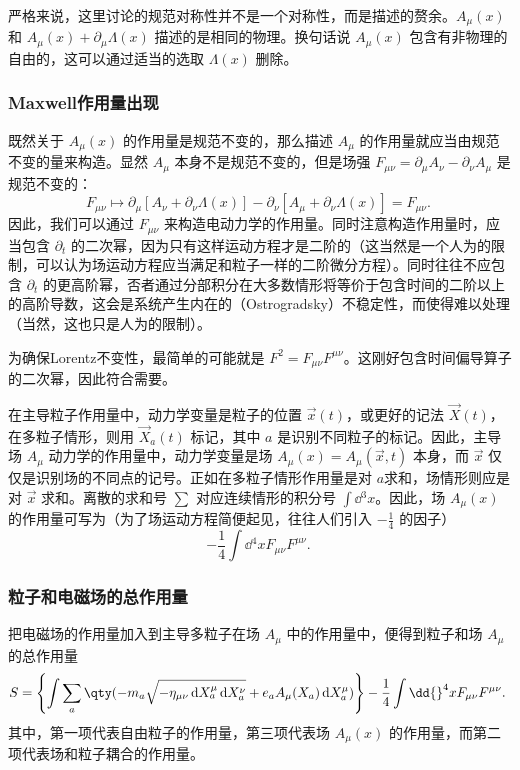 严格来说，这里讨论的规范对称性并不是一个对称性，而是描述的赘余。$A_\mu(x)$ 和 $A_\mu(x)+\partial_\mu\Lambda(x)$ 描述的是相同的物理。换句话说 $A_\mu(x)$ 包含有非物理的自由的，这可以通过适当的选取 $\Lambda(x)$ 删除。

\subsubsection{Maxwell作用量出现}

既然关于 $A_\mu(x)$ 的作用量是规范不变的，那么描述 $A_\mu$ 的作用量就应当由规范不变的量来构造。显然 $A_\mu$ 本身不是规范不变的，但是场强 $F_{\mu\nu}=\partial_\mu A_\nu-\partial_\nu A_\mu$ 是规范不变的：
\begin{equation}
F_{\mu\nu}\mapsto \partial_\mu[ A_\nu+\partial_\nu\Lambda(x)]-\partial_\nu[ A_\mu+\partial_\nu\Lambda(x)]=F_{\mu\nu}.~
\end{equation}
因此，我们可以通过 $F_{\mu\nu}$ 来构造电动力学的作用量。同时注意构造作用量时，应当包含 $\partial_t$ 的二次幂，因为只有这样运动方程才是二阶的（这当然是一个人为的限制，可以认为场运动方程应当满足和粒子一样的二阶微分方程）。同时往往不应包含 $\partial_t$ 的更高阶幂，否者通过分部积分在大多数情形将等价于包含时间的二阶以上的高阶导数，这会是系统产生内在的（Ostrogradsky）不稳定性，而使得难以处理（当然，这也只是人为的限制）。

为确保Lorentz不变性，最简单的可能就是 $F^2=F_{\mu\nu}F^{\mu\nu}$。这刚好包含时间偏导算子的二次幂，因此符合需要。

在主导粒子作用量中，动力学变量是粒子的位置 $\vec x(t)$，或更好的记法 $\vec X(t)$，在多粒子情形，则用 $\vec X_a(t)$ 标记，其中 $a$ 是识别不同粒子的标记。因此，主导场 $A_\mu$ 动力学的作用量中，动力学变量是场 $A_\mu(x)=A_\mu(\vec x,t)$ 本身，而 $\vec x$ 仅仅是识别场的不同点的记号。正如在多粒子情形作用量是对 $a$求和，场情形则应是对 $\vec x$ 求和。离散的求和号 $\sum$ 对应连续情形的积分号 $\int\dd{}^3 x$。因此，场 $A_\mu(x)$ 的作用量可写为（为了场运动方程简便起见，往往人们引入 $-\frac{1}{4}$ 的因子）
\begin{equation}
-\frac{1}{4}\int\dd{}^4 x F_{\mu\nu}F^{\mu\nu}.~
\end{equation}

\subsubsection{粒子和电磁场的总作用量}

把电磁场的作用量加入到主导多粒子在场 $A_\mu$ 中的作用量中，便得到粒子和场 $A_\mu$ 的总作用量
\begin{equation}
 S=\left\{\int\sum_a\qty(-m_a\sqrt{-\eta_{\mu\nu} \,\mathrm{d} X_a ^\mu \,\mathrm{d}X_a ^\nu}+e_aA_\mu(X_a) \,\mathrm{d}X_a ^\mu) \right\}-\frac{1}{4}\int\dd{}^4 x F_{\mu\nu}F^{\mu\nu}.~
\end{equation}
其中，第一项代表自由粒子的作用量，第三项代表场 $A_\mu(x)$ 的作用量，而第二项代表场和粒子耦合的作用量。









